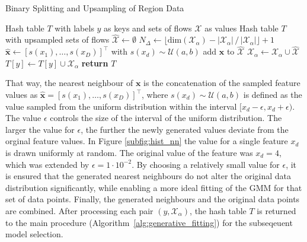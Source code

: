 \documentclass[../../main.tex]{subfiles}
\begin{document}
 \begin{algorithm}
    \caption{Binary Splitting and Upsampling of Region Data}
    \label{alg:upsampling}
 
    \begin{algorithmic}[1]
        \REQUIRE Hash table $T$ with labels $y$ as keys and sets of flows $\mathcal{X}$ as values
        \ENSURE Hash table $T$ with upsampled sets of flows
                \STATE $\hat{\mathcal{X}} \leftarrow \emptyset$
                \STATE $N_\Delta \leftarrow \lfloor \text{dim}(\mathcal{X}_\alpha) - |\mathcal{X}_\alpha| \, / \, |\mathcal{X}_\alpha| \rfloor + 1 $
                        \STATE $\hat{\bm{x}} \leftarrow [s(x_1), \dots, s(x_D)]^\top$ with $s(x_d) \sim \mathcal{U}(a, b)$
                        \STATE add $\hat{\bm{x}}$ to $\hat{\mathcal{X}}$
                    \ENDFOR
                \ENDFOR
                \STATE $\mathcal{X}_\alpha \leftarrow \mathcal{X}_\alpha \cup \hat{\mathcal{X}}$
                \STATE $T[y] \leftarrow T[y] \cup \mathcal{X}_\alpha$ 
            \ENDIF
        \ENDFOR
        \STATE \textbf{return} $T$
    \end{algorithmic}
 \end{algorithm}
 
 That way, the nearest neighbour of $\bm{x}$ is the concatenation of the sampled feature values as $\hat{\bm{x}} = [s(x_1), \dots, s(x_D)]^\top$, where $s(x_d) \sim \mathcal{U}(a, b)$ is defined as the value sampled from the uniform distribution within the interval $[x_d-\epsilon, x_d+\epsilon)$. The value $\epsilon$ controls the size of the interval of the uniform distribution. The larger the value for $\epsilon$, the further the newly generated values deviate from the orginal feature values. In Figure \ref{subfig:hist_nn} the value for a single feature $x_d$ is drawn uniformly at random. The original value of the feature was $x_d=4$, which was extended by $\epsilon=1\cdot10^{-2}$. By choosing a relatively small value for $\epsilon$, it is ensured that the generated nearest neighbours do not alter the original data distribution significantly, while enabling a more ideal fitting of the GMM for that set of data points. Finally, the generated neighbours and the original data points are combined. After processing each pair $(y, \mathcal{X}_\alpha)$, the hash table $T$ is returned to the main procedure (Algorithm~\ref{alg:generative_fitting}) for the subseqeuent model selection.
\end{document}
